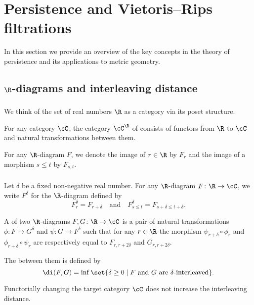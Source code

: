 
\section{Persistence and Vietoris--Rips filtrations}

In this section we provide an overview of the key concepts in the theory of persistence and its applications to metric geometry.

\subsection{$\R$-diagrams and interleaving distance}

\subsubsection{}

We think of the set of real numbers $\R$ as a category via its poset structure.

For any category $\cC$, the category $\cC^\R$ of  consists of functors from $\R$ to $\cC$ and natural transformations between them.

For any $\R$-diagram $F$, we denote the image of $r \in \R$ by $F_r$ and the image of a morphism $s \leq t$ by $F_{s,t}$.

\subsubsection{}\label{ss:interleaving}

Let $\delta$ be a fixed non-negative real number.
For any $\R$-diagram $F \colon \R \to \cC$, we write $F^\delta$ for the $\R$-diagram defined by
\[
F^\delta_r = F_{r+\delta}
\quad\text{and}\quad
F^\delta_{s \leq t} = F_{s+\delta \leq t+\delta}.
\]

A  of two $\R$-diagrams $F,G \colon \R \to \cC$ is a pair of natural transformations
$\phi \colon F \to G^\delta$ and $\psi \colon G \to F^\delta$ such that for any $r \in \R$ the morphism $\psi_{r+\delta} \circ \phi_r$ and $\phi_{r+\delta} \circ \psi_r$ are respectively equal to $F_{r,r+2\delta}$ and $G_{r,r+2\delta}$.

The  between them is defined by
\[
\di(F, G) = \inf\set{\delta \geq 0 \mid F \text{ and } G \text{ are } \delta\text{-interleaved}}.
\]

Functorially changing the target category $\cC$ does not increase the interleaving distance.

